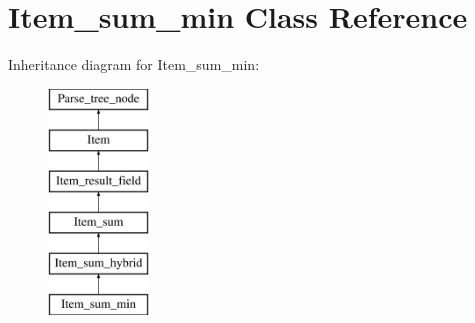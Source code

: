 \hypertarget{classItem__sum__min}{}\section{Item\+\_\+sum\+\_\+min Class Reference}
\label{classItem__sum__min}
Inheritance diagram for Item\+\_\+sum\+\_\+min\+:\begin{figure}[H]
\begin{center}
\leavevmode
\includegraphics[height=6.000000cm]{classItem__sum__min}
\end{center}
\end{figure}
